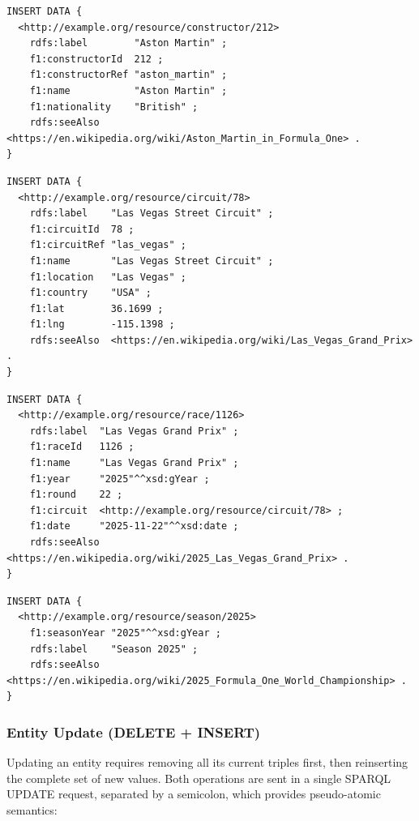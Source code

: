 \documentclass[12pt,a4paper]{article}
\begin{document}
\begin{lstlisting}[style=sparql, caption={INSERT DATA for a new constructor}]
INSERT DATA {
  <http://example.org/resource/constructor/212>
    rdfs:label        "Aston Martin" ;
    f1:constructorId  212 ;
    f1:constructorRef "aston_martin" ;
    f1:name           "Aston Martin" ;
    f1:nationality    "British" ;
    rdfs:seeAlso      <https://en.wikipedia.org/wiki/Aston_Martin_in_Formula_One> .
}
\end{lstlisting}

\begin{lstlisting}[style=sparql, caption={INSERT DATA for a new circuit}]
INSERT DATA {
  <http://example.org/resource/circuit/78>
    rdfs:label    "Las Vegas Street Circuit" ;
    f1:circuitId  78 ;
    f1:circuitRef "las_vegas" ;
    f1:name       "Las Vegas Street Circuit" ;
    f1:location   "Las Vegas" ;
    f1:country    "USA" ;
    f1:lat        36.1699 ;
    f1:lng        -115.1398 ;
    rdfs:seeAlso  <https://en.wikipedia.org/wiki/Las_Vegas_Grand_Prix> .
}
\end{lstlisting}

\begin{lstlisting}[style=sparql, caption={INSERT DATA for a new race, linking to an existing circuit}]
INSERT DATA {
  <http://example.org/resource/race/1126>
    rdfs:label  "Las Vegas Grand Prix" ;
    f1:raceId   1126 ;
    f1:name     "Las Vegas Grand Prix" ;
    f1:year     "2025"^^xsd:gYear ;
    f1:round    22 ;
    f1:circuit  <http://example.org/resource/circuit/78> ;
    f1:date     "2025-11-22"^^xsd:date ;
    rdfs:seeAlso <https://en.wikipedia.org/wiki/2025_Las_Vegas_Grand_Prix> .
}
\end{lstlisting}

\begin{lstlisting}[style=sparql, caption={INSERT DATA for a new season}]
INSERT DATA {
  <http://example.org/resource/season/2025>
    f1:seasonYear "2025"^^xsd:gYear ;
    rdfs:label    "Season 2025" ;
    rdfs:seeAlso  <https://en.wikipedia.org/wiki/2025_Formula_One_World_Championship> .
}
\end{lstlisting}

\subsubsection{Entity Update (DELETE + INSERT)}

Updating an entity requires removing all its current triples first, then
reinserting the complete set of new values. Both operations are sent in a
single SPARQL UPDATE request, separated by a semicolon, which provides
pseudo-atomic semantics:
\end{document}
